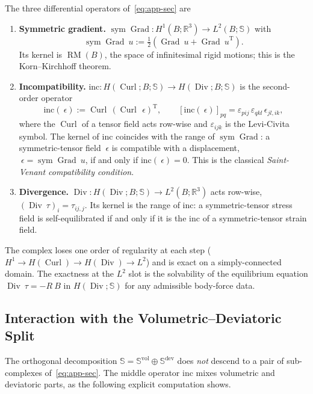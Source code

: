 \documentclass[12pt]{article}
\newcommand{\Reals}{\mathbb{R}}
\newcommand{\Syms}{\mathbb{S}}
\newcommand{\supvol}{^{\mathrm{vol}}}
\newcommand{\supdev}{^{\mathrm{dev}}}
\newcommand{\Symsd}{\mathbb{S}\supdev}
\DeclareMathOperator{\Div}{Div}
\DeclareMathOperator{\Grad}{Grad}
\DeclareMathOperator{\Curl}{Curl}
\DeclareMathOperator{\sym}{sym}
\newcommand{\transpose}[1]{{#1}^{\mathrm{T}}}
\begin{document}
The three differential operators of~\eqref{eq:app-sec} are
\begin{enumerate}
  \item \textbf{Symmetric gradient.}
    $\sym\Grad : H^1(B; \Reals^3) \to L^2(B; \Syms)$ with
    \begin{equation}
      \label{eq:app-symgrad}
      \sym\Grad ~u
      :=
      \tfrac{1}{2}\!\left(\Grad ~u + \transpose{\Grad ~u}\right).
    \end{equation}
    Its kernel is $\operatorname{RM}(B)$, the space of infinitesimal
    rigid motions; this is the Korn--Kirchhoff theorem.
  \item \textbf{Incompatibility.}
    $\mathrm{inc} : H(\Curl; B; \Syms) \to H(\Div; B; \Syms)$ is the
    second-order operator
    \begin{equation}
      \label{eq:app-inc}
      \mathrm{inc}(~\epsilon)
      :=
      \Curl\,\transpose{(\Curl\,~\epsilon)},
      \qquad
      \left[\mathrm{inc}(~\epsilon)\right]_{pq}
      =
      \varepsilon_{pij}\,\varepsilon_{qkl}\,\epsilon_{jl,ik},
    \end{equation}
    where the $\Curl$ of a tensor field acts row-wise and
    $\varepsilon_{ijk}$ is the Levi-Civita symbol. The kernel of
    $\mathrm{inc}$ coincides with the range of $\sym\Grad$: a
    symmetric-tensor field $~\epsilon$ is compatible with a
    displacement, $~\epsilon = \sym\Grad ~u$, if and only if
    $\mathrm{inc}(~\epsilon) = 0$. This is the classical
    \emph{Saint-Venant compatibility condition}.
  \item \textbf{Divergence.}
    $\Div : H(\Div; B; \Syms) \to L^2(B; \Reals^3)$ acts row-wise,
    $(\Div ~\tau)_i = \tau_{ij,j}$. Its kernel is the range of
    $\mathrm{inc}$: a symmetric-tensor stress field is self-equilibrated
    if and only if it is the $\mathrm{inc}$ of a symmetric-tensor
    strain field.
\end{enumerate}
The complex loses one order of regularity at each step
($H^1 \to H(\Curl) \to H(\Div) \to L^2$) and is exact on a
simply-connected domain. The exactness at the $L^2$ slot is the
solvability of the equilibrium equation $\Div~\tau = -R~B$ in
$H(\Div; \Syms)$ for any admissible body-force data.

\subsection{Interaction with the Volumetric--Deviatoric Split}
\label{app:sec-voldev}

The orthogonal decomposition $\Syms = \Syms\supvol \oplus \Symsd$
does \emph{not} descend to a pair of sub-complexes of~\eqref{eq:app-sec}.
The middle operator $\mathrm{inc}$ mixes volumetric and deviatoric
parts, as the following explicit computation shows.
\end{document}

